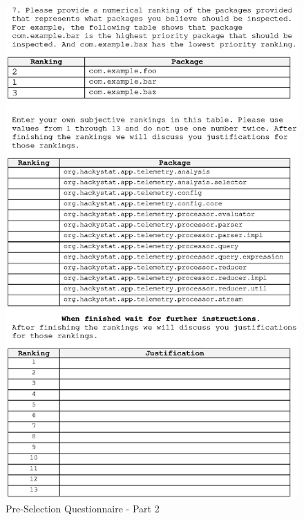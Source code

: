 \begin{figure}[htbp]
  \centering
  \includegraphics[width=1.0\textwidth]{figs/Questionnaire-Pre-shrunk_2.eps}
  \caption{Pre-Selection Questionnaire - Part 2}
  \label{fig:questionnaire-pre2}
\end{figure}

